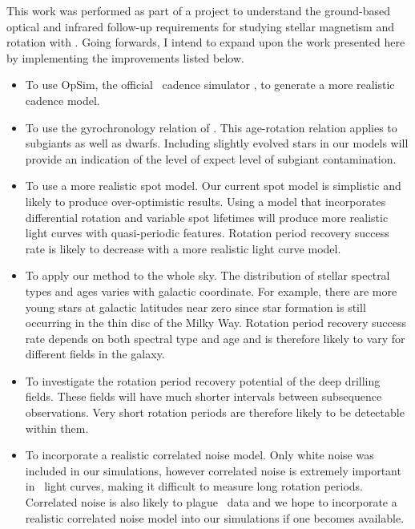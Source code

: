 This work was performed as part of a project to understand the ground-based
optical and infrared follow-up requirements for studying stellar magnetism and
rotation with \LSST.
Going forwards, I intend to expand upon the work presented here by
implementing the improvements listed below.
\begin{itemize}
\item{To use OpSim, the official \LSST\ cadence simulator \citep{Ridgway2012},
to generate a more realistic cadence model.}
\item{To use the gyrochronology relation of \citet{Vansaders2013}.
This age-rotation relation applies to subgiants as well as dwarfs.
Including slightly evolved stars in our models will provide an indication of
the level of expect level of subgiant contamination.}
\item{To use a more realistic spot model.
Our current spot model is simplistic and likely to produce over-optimistic
results.
Using a model that incorporates differential rotation and variable spot
lifetimes will produce more realistic light curves with quasi-periodic
features.
Rotation period recovery success rate is likely to decrease with a more
realistic light curve model.
}
\item{To apply our method to the whole sky.
The distribution of stellar spectral types and ages varies with galactic
coordinate.
For example, there are more young stars at galactic latitudes near zero since
star formation is still occurring in the thin disc of the Milky Way.
Rotation period recovery success rate depends on both spectral type and
age and is therefore likely to vary for different fields in the galaxy.}
\item{To investigate the rotation period recovery potential of
the deep drilling fields.
These fields will have much shorter intervals between subsequence
observations.
Very short rotation periods are therefore likely to be detectable within
them.}
\item{To incorporate a realistic correlated noise model.
Only white noise was included in our simulations, however correlated noise is
extremely important in \kepler\ light curves, making it difficult to measure
long rotation periods.
Correlated noise is also likely to plague \LSST\ data and we hope to
incorporate a realistic correlated noise model into our simulations if one
becomes available.}
\end{itemize}
